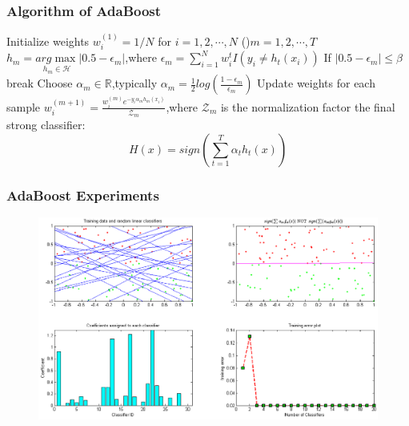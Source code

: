 \documentclass{beamer}
\begin{document}
\begin{CJK*}{UTF8}{gbsn}
\begin{frame}\frametitle{Algorithm of AdaBoost}
\begin{algorithm}[H]
Initialize weights $w_i^{(1)}=1/N$ for $i=1,2,\cdots,N$\;
\For(){$m=1,2,\cdots,T$}
{
    $h_m=\underset{h_m\in\mathcal{H}}{arg\max}|0.5-\epsilon_m|$,where $\epsilon_m=\sum_{i=1}^Nw_i^{t}I(y_i\neq h_t(x_i))$\;
    If $|0.5-\epsilon_m|\leq\beta$ break\;
    Choose $\alpha_m\in\mathbb{R}$,typically $\alpha_m=\frac{1}{2}log(\frac{1-\epsilon_m}{\epsilon_m})$\;
    Update weights for each sample $w_i^{(m+1)}=\frac{w_i^{(m)}e^{-y_i\alpha_mh_m(x_i)}}{\mathcal{Z}_m}$,where $\mathcal{Z}_m$ is the normalization factor\;
}
\Return the final strong classifier:
\begin{equation}
H(x)=sign(\sum_{t=1}^T\alpha_th_t(x))
\end{equation}\;
\end{algorithm}
\end{frame}

\begin{frame}\frametitle{AdaBoost Experiments}
\begin{figure}
\centering
\includegraphics[scale=0.43]{images/AdaBoost_experiment}
\end{figure}
\end{frame}


\end{CJK*}
\end{document}
